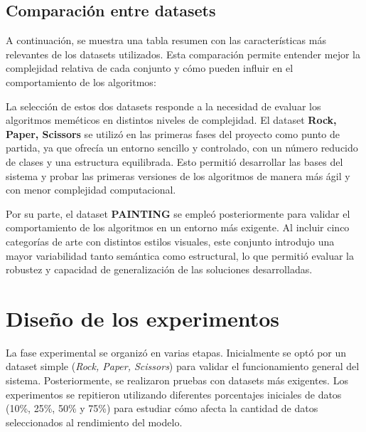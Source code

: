 \subsection{Comparación entre datasets}\label{subsec:comparacion-entre-datasets}
A continuación, se muestra una tabla resumen con las características más relevantes de los datasets utilizados.
Esta comparación permite entender mejor la complejidad relativa de cada conjunto y cómo pueden influir en el comportamiento de los algoritmos:

\begin{table}[H]
    \centering
    \caption{Resumen comparativo de los datasets utilizados}
    \label{tab:resumen-datasets}
\end{table}

La selección de estos dos datasets responde a la necesidad de evaluar los algoritmos meméticos en distintos niveles de complejidad.
El dataset \textbf{Rock, Paper, Scissors} se utilizó en las primeras fases del proyecto como punto de partida,
ya que ofrecía un entorno sencillo y controlado, con un número reducido de clases y una estructura equilibrada.
Esto permitió desarrollar las bases del sistema y probar las primeras versiones de los algoritmos de manera más ágil y con menor complejidad computacional.

Por su parte, el dataset \textbf{PAINTING} se empleó posteriormente para validar el comportamiento de los algoritmos en un entorno más exigente.
Al incluir cinco categorías de arte con distintos estilos visuales, este conjunto introdujo una mayor variabilidad tanto semántica como estructural,
lo que permitió evaluar la robustez y capacidad de generalización de las soluciones desarrolladas.


\section{Diseño de los experimentos}\label{sec:diseño-de-los-experimentos}
La fase experimental se organizó en varias etapas.
Inicialmente se optó por un dataset simple (\textit{Rock, Paper, Scissors}) para validar el funcionamiento general del sistema.
Posteriormente, se realizaron pruebas con datasets más exigentes.
Los experimentos se repitieron utilizando diferentes porcentajes iniciales de datos (10\%, 25\%, 50\% y 75\%)
para estudiar cómo afecta la cantidad de datos seleccionados al rendimiento del modelo.

